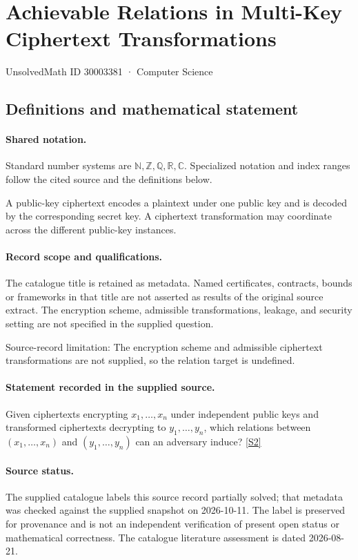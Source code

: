 \documentclass[11pt]{article}
\newcommand{\sref}[2]{\hyperlink{source:#1:#2}{[S#2]}}
\begin{document}
\setcounter{section}{30003380}
\section{Achievable Relations in Multi-Key Ciphertext Transformations}\label{30003381}
{\small\sffamily UnsolvedMath ID 30003381 · Computer Science}
\subsection{Definitions and mathematical statement}

\paragraph{Shared notation.}Standard number systems are $\mathbb N,\mathbb Z,\mathbb Q,\mathbb R,\mathbb C$. Specialized notation and index ranges follow the cited source and the definitions below.


A public-key ciphertext encodes a plaintext under one public key and is decoded by the corresponding secret key. A ciphertext transformation may coordinate across the different public-key instances.
\paragraph{Record scope and qualifications.}
The catalogue title is retained as metadata. Named certificates, contracts, bounds or frameworks in that title are not asserted as results of the original source extract.
The encryption scheme, admissible transformations, leakage, and security setting are not specified in the supplied question.

Source-record limitation: The encryption scheme and admissible ciphertext transformations are not supplied, so the relation target is undefined.
\paragraph{Statement recorded in the supplied source.}
Given ciphertexts encrypting $x_1,\ldots,x_n$ under independent public keys and transformed ciphertexts decrypting to $y_1,\ldots,y_n$, which relations between $(x_1,\ldots,x_n)$ and $(y_1,\ldots,y_n)$ can an adversary induce? \sref{30003381}{2}
\paragraph{Source status.}
The supplied catalogue labels this source record partially solved; that metadata was checked against the supplied snapshot on 2026-10-11. The label is preserved for provenance and is not an independent verification of present open status or mathematical correctness. The catalogue literature assessment is dated 2026-08-21.
\end{document}
